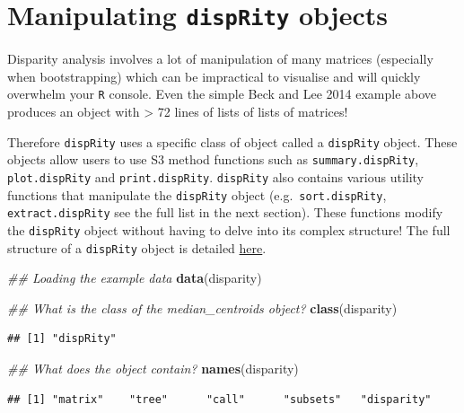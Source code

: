 \documentclass[
]{book}
\newenvironment{Shaded}{\begin{snugshade}}{\end{snugshade}}
\newcommand{\CommentTok}[1]{\textcolor[rgb]{0.56,0.35,0.01}{\textit{#1}}}
\newcommand{\KeywordTok}[1]{\textcolor[rgb]{0.13,0.29,0.53}{\textbf{#1}}}
\newcommand{\NormalTok}[1]{#1}
\begin{document}
\hypertarget{manipulating-disprity-objects}{%
\section{\texorpdfstring{Manipulating \texttt{dispRity} objects}{Manipulating dispRity objects}}\label{manipulating-disprity-objects}}

Disparity analysis involves a lot of manipulation of many matrices (especially when bootstrapping) which can be impractical to visualise and will quickly overwhelm your \texttt{R} console.
Even the simple Beck and Lee 2014 example above produces an object with \textgreater{} 72 lines of lists of lists of matrices!

Therefore \texttt{dispRity} uses a specific class of object called a \texttt{dispRity} object.
These objects allow users to use S3 method functions such as \texttt{summary.dispRity}, \texttt{plot.dispRity} and \texttt{print.dispRity}.
\texttt{dispRity} also contains various utility functions that manipulate the \texttt{dispRity} object (e.g.~\texttt{sort.dispRity}, \texttt{extract.dispRity} see the full list in the next section).
These functions modify the \texttt{dispRity} object without having to delve into its complex structure!
The full structure of a \texttt{dispRity} object is detailed \href{https://github.com/TGuillerme/dispRity/blob/master/disparity_object.md}{here}.

\begin{Shaded}
\begin{Highlighting}[]
\CommentTok{\#\# Loading the example data}
\KeywordTok{data}\NormalTok{(disparity)}

\CommentTok{\#\# What is the class of the median\_centroids object?}
\KeywordTok{class}\NormalTok{(disparity)}
\end{Highlighting}
\end{Shaded}

\begin{verbatim}
## [1] "dispRity"
\end{verbatim}

\begin{Shaded}
\begin{Highlighting}[]
\CommentTok{\#\# What does the object contain?}
\KeywordTok{names}\NormalTok{(disparity)}
\end{Highlighting}
\end{Shaded}

\begin{verbatim}
## [1] "matrix"    "tree"      "call"      "subsets"   "disparity"
\end{verbatim}
\end{document}
